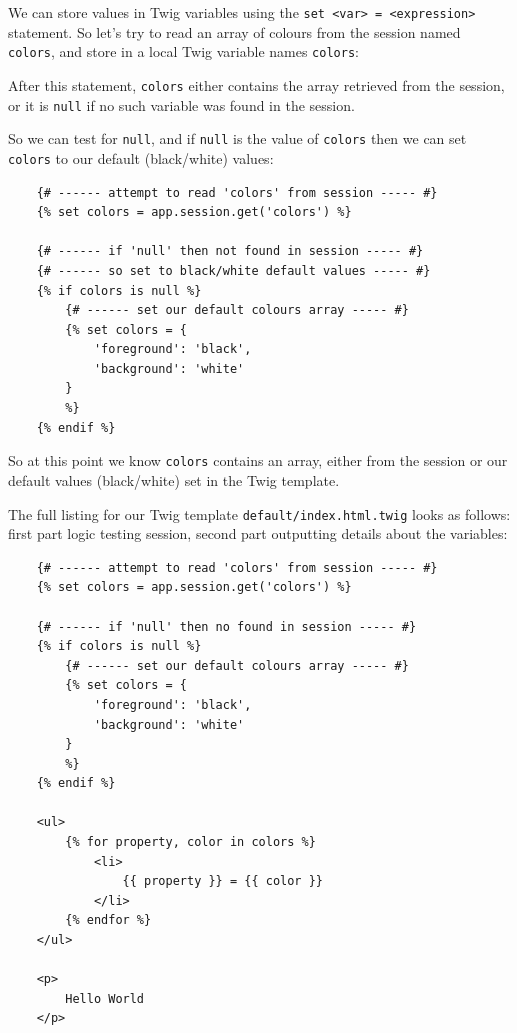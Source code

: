 \documentclass[a4paperpaper,openright]{book}
\newenvironment{Shaded}{}{}
\newcommand{\NormalTok}[1]{#1}
\begin{document}
We can store values in Twig variables using the
\texttt{set\ \textless{}var\textgreater{}\ =\ \textless{}expression\textgreater{}}
statement. So let's try to read an array of colours from the session
named \texttt{colors}, and store in a local Twig variable names
\texttt{colors}:

\begin{Shaded}
\begin{Highlighting}[]
\NormalTok{    \{%
\end{Highlighting}
\end{Shaded}

After this statement, \texttt{colors} either contains the array
retrieved from the session, or it is \texttt{null} if no such variable
was found in the session.

So we can test for \texttt{null}, and if \texttt{null} is the value of
\texttt{colors} then we can set \texttt{colors} to our default
(black/white) values:

\begin{verbatim}
    {# ------ attempt to read 'colors' from session ----- #}
    {% set colors = app.session.get('colors') %}

    {# ------ if 'null' then not found in session ----- #}
    {# ------ so set to black/white default values ----- #}
    {% if colors is null %}
        {# ------ set our default colours array ----- #}
        {% set colors = {
            'foreground': 'black',
            'background': 'white'
        }
        %}
    {% endif %}
\end{verbatim}

So at this point we know \texttt{colors} contains an array, either from
the session or our default values (black/white) set in the Twig
template.

The full listing for our Twig template \texttt{default/index.html.twig}
looks as follows: first part logic testing session, second part
outputting details about the variables:

\begin{verbatim}
    {# ------ attempt to read 'colors' from session ----- #}
    {% set colors = app.session.get('colors') %}

    {# ------ if 'null' then no found in session ----- #}
    {% if colors is null %}
        {# ------ set our default colours array ----- #}
        {% set colors = {
            'foreground': 'black',
            'background': 'white'
        }
        %}
    {% endif %}

    <ul>
        {% for property, color in colors %}
            <li>
                {{ property }} = {{ color }}
            </li>
        {% endfor %}
    </ul>

    <p>
        Hello World
    </p>
\end{verbatim}
\end{document}
